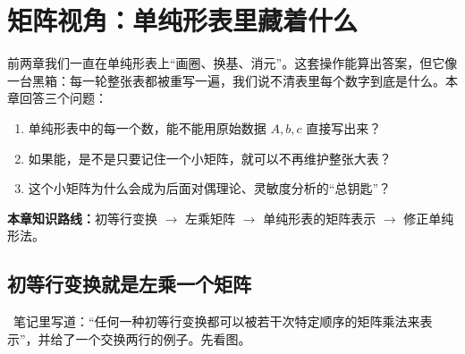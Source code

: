 \section{矩阵视角：单纯形表里藏着什么}

前两章我们一直在单纯形表上“画圈、换基、消元”。这套操作能算出答案，但它像一台黑箱：每一轮整张表都被重写一遍，我们说不清表里每个数字到底是什么。本章回答三个问题：
\begin{enumerate}
  \item 单纯形表中的每一个数，能不能用原始数据 $A,b,c$ 直接写出来？
  \item 如果能，是不是只要记住一个小矩阵，就可以不再维护整张大表？
  \item 这个小矩阵为什么会成为后面对偶理论、灵敏度分析的“总钥匙”？
\end{enumerate}
\noindent\textbf{本章知识路线：}初等行变换 $\to$ 左乘矩阵 $\to$ 单纯形表的矩阵表示 $\to$ 修正单纯形法。

\subsection{初等行变换就是左乘一个矩阵}

\ 笔记里写道：“任何一种初等行变换都可以被若干次特定顺序的矩阵乘法来表示”，并给了一个交换两行的例子。先看图。

